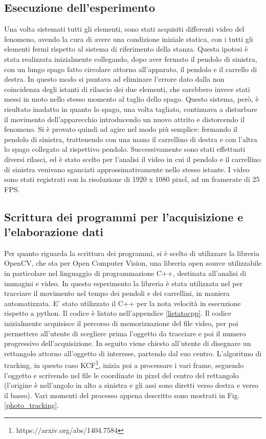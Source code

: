 \documentclass[11pt, a4paper, twoside]{article}
\begin{document}
\subsection{Esecuzione dell'esperimento}

Una volta sistemati tutti gli elementi, sono stati acquisiti differenti video del fenomeno, avendo la cura di avere una condizione
iniziale statica, con i tutti gli elementi fermi rispetto al sistema di riferimento della stanza.
Questa ipotesi è stata realizzata 
inizialmente collegando, dopo aver fermato il pendolo di sinistra, 
con un lungo spago fatto circolare attorno all'apparato, il pendolo e il carrello di destra.
In questo modo si puntava ad eliminare l'errore dato dalla non coincidenza degli istanti
di rilascio dei due elementi, che sarebbero invece stati messi in moto nello stesso momento al 
taglio dello spago.
Questo sistema, però, è risultato inadatto in quanto lo spago, una volta tagliato, continuava a 
disturbare il movimento dell'apparecchio introducendo un nuovo attrito e 
distorcendo il fenomeno.
Si è provato quindi ad agire nel modo più semplice: fermando il pendolo di sinistra, trattenendo con una mano il carrellino di destra e con l'altra lo spago 
collegato al rispettivo pendolo.
Successivamente sono stati effettuati diversi rilasci, ed è 
stato scelto per l'analisi il video in cui il pendolo e il carrellino di sinistra venivano
sganciati approssimativamente nello stesso istante.
I video sono stati registrati con la risoluzione
di 1920 x 1080 pixel, ad un framerate di 25 FPS.
\label{sezione_realizz}

\subsection{Scrittura dei programmi per l'acquisizione e l'elaborazione dati}

Per quanto riguarda la scrittura dei programmi, si è scelto di utilizzare 
la libreria OpenCV, che sta per Open Computer Vision, una libreria open source 
utilizzabile in particolare nel linguaggio di programmazione C++, 
destinata all'analisi di immagini e video. 
In questo esperimento la libreria è stata utilizzata nel per tracciare il 
movimento nel tempo dei pendoli e dei carrellini, in maniera automatizzata.
E' stato utilizzato il C++ per la nota velocità in esecuzione rispetto a 
python. Il codice è listato nell'appendice \ref{listatocpp}.
Il codice inizialmente acquisisce il percorso di memorizzazione del file video, per poi 
permettere all'utente di scegliere prima l'oggetto da tracciare
 e poi 
il numero progressivo dell'acquisizione.
In seguito viene chiesto all'utente di disegnare un rettangolo attorno
all'oggetto di interesse, partendo dal suo centro.
L'algoritmo di tracking, in questo caso KCF\footnote{https://arxiv.org/abs/1404.7584}, 
inizia poi a processare i vari frame, seguendo l'oggetto e scrivendo nel file
le coordinate in pixel del centro del rettangolo (l'origine è nell'angolo in alto a sinistra e gli assi 
sono diretti verso destra e verso il basso).
Vari momenti del processo appena descritto sono mostrati in Fig.\ref{photo_tracking}.
\end{document}
